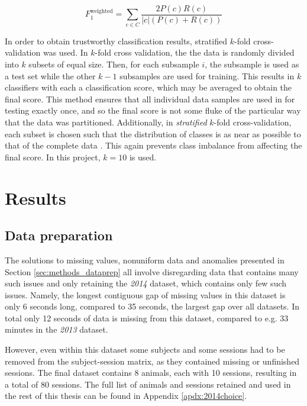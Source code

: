 \documentclass[conference,a4paper,twoside]{IEEEtran}
\begin{document}
\begin{equation}
    \label{eq:f1}
    F_1^{\text{weighted}} = \sum_{c \in C} \frac{2 P(c) R(c)}{|c| (P(c) + R(c))}
\end{equation}

In order to obtain trustworthy classification results, stratified $k$-fold cross-validation was used. In $k$-fold cross validation, the the data is randomly divided into $k$ subsets of equal size. Then, for each subsample $i$, the subsample is used as a test set while the other $k-1$ subsamples are used for training. This results in $k$ classifiers with each a classification score, which may be averaged to obtain the final score. This method ensures that all individual data samples are used in for testing exactly once, and so the final score is not some fluke of the particular way that the data was partitioned. Additionally, in \emph{stratified} $k$-fold cross-validation, each subset is chosen such that the distribution of classes is as near as possible to that of the complete data \cite{diamantidis2000unsupervised}. This again prevents class imbalance from affecting the final score. In this project, $k=10$ is used.

\section{Results}
\label{sec:results}

\subsection{Data preparation}
\label{sec:results_dataprep}
The solutions to missing values, nonuniform data and anomalies presented in Section \ref{sec:methods_dataprep} all involve disregarding data that contains many such issues and only retaining the \emph{2014} dataset, which contains only few such issues. Namely, the longest contiguous gap of missing values in this dataset is only 6 seconds long, compared to 35 seconds, the largest gap over all datasets. In total only 12 seconds of data is missing from this dataset, compared to e.g. 33 minutes in the \emph{2013} dataset.

However, even within this dataset some subjects and some sessions had to be removed from the subject-session matrix, as they contained missing or unfinished sessions. The final dataset contains 8 animals, each with 10 sessions, resulting in a total of 80 sessions. The full list of animals and sessions retained and used in the rest of this thesis can be found in Appendix \ref{apdx:2014choice}.
\end{document}
